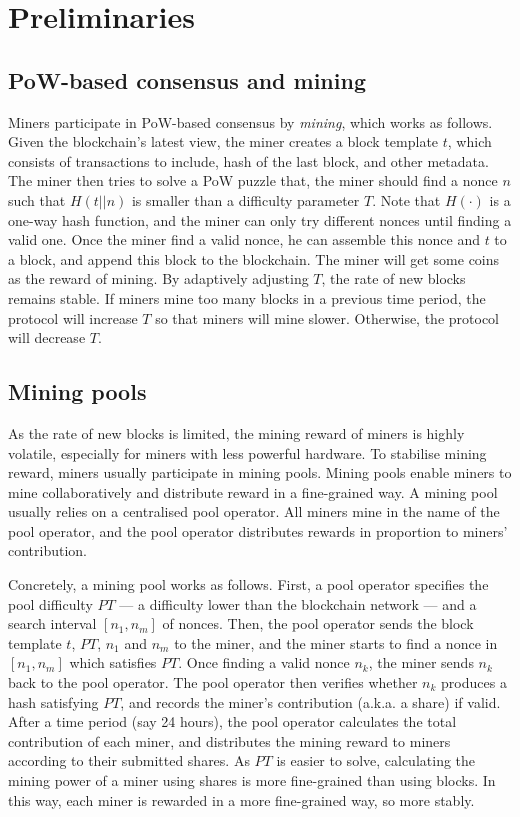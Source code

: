 \section{Preliminaries}
\label{sec:preliminaries}

\subsection{PoW-based consensus and mining}
Miners participate in PoW-based consensus by \emph{mining}, which works as follows.
Given the blockchain's latest view, the miner creates a block template $t$, which consists of transactions to include, hash of the last block, and other metadata.
The miner then tries to solve a PoW puzzle that, the miner should find a nonce $n$ such that $H(t || n)$ is smaller than a difficulty parameter $T$.
Note that $H(\cdot)$ is a one-way hash function, and the miner can only try different nonces until finding a valid one.
Once the miner find a valid nonce, he can assemble this nonce and $t$ to a block, and append this block to the blockchain.
The miner will get some coins as the reward of mining.
By adaptively adjusting $T$, the rate of new blocks remains stable.
If miners mine too many blocks in a previous time period, the protocol will increase $T$ so that miners will mine slower.
Otherwise, the protocol will decrease $T$.

\subsection{Mining pools}
As the rate of new blocks is limited, the mining reward of miners is highly volatile, especially for miners with less powerful hardware.
To stabilise mining reward, miners usually participate in mining pools.
Mining pools enable miners to mine collaboratively and distribute reward in a fine-grained way.
A mining pool usually relies on a centralised pool operator.
All miners mine in the name of the pool operator, and the pool operator distributes rewards in proportion to miners' contribution.

Concretely, a mining pool works as follows.
First, a pool operator specifies the pool difficulty $PT$ --- a difficulty lower than the blockchain network --- and a search interval $[n_1, n_m]$ of nonces.
Then, the pool operator sends the block template $t$, $PT$, $n_1$ and $n_m$ to the miner, and the miner starts to find a nonce in $[n_1, n_m]$ which satisfies $PT$.
Once finding a valid nonce $n_k$, the miner sends $n_k$ back to the pool operator.
The pool operator then verifies whether $n_k$ produces a hash satisfying $PT$, and records the miner's contribution (a.k.a. a share) if valid.
After a time period (say 24 hours), the pool operator calculates the total contribution of each miner, and distributes the mining reward to miners according to their submitted shares.
As $PT$ is easier to solve, calculating the mining power of a miner using shares is more fine-grained than using blocks.
In this way, each miner is rewarded in a more fine-grained way, so more stably.


